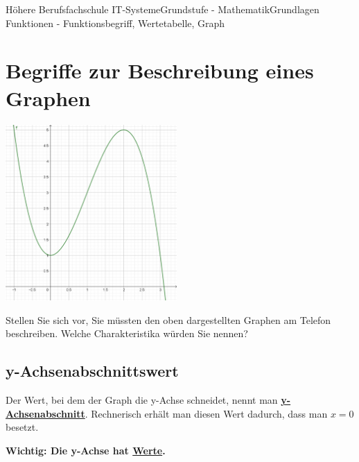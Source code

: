 \documentclass[11pt,twocolumn,oneside,openany,headings=optiontotoc,11pt,numbers=noenddot]{article}
\begin{document}
	\begin{worksheet}{Höhere Berufsfachschule IT-Systeme}{Grundstufe - Mathematik}{Grundlagen Funktionen - Funktionsbegriff, Wertetabelle, Graph}
		\setcounter{section}{0}
		\section{Begriffe zur Beschreibung eines Graphen}
		\includegraphics[width=0.49\textwidth]{../99_Bilder/basicsBsp.png}\\
		\par\bigskip\noindent
		Stellen Sie sich vor, Sie müssten den oben dargestellten Graphen am Telefon beschreiben. Welche Charakteristika würden Sie nennen?
		\subsection*{y-Achsenabschnittswert}
		Der Wert, bei dem der Graph die y-Achse schneidet, nennt man \textbf{\underline{y-Achsenabschnitt}}. Rechnerisch erhält man diesen Wert dadurch, dass man \(x= 0\) besetzt.\\
		\par\bigskip\noindent
		\textbf{Wichtig: Die y-Achse hat \underline{Werte}.}

\end{worksheet}
\end{document}

